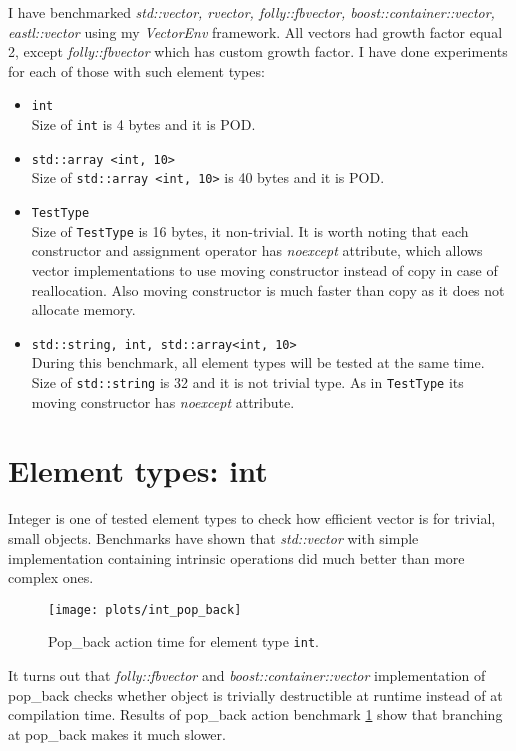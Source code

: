 \documentclass[inz, english, shortabstract]{iithesis}
\begin{document}
I have benchmarked {\it std::vector, rvector, folly::fbvector, boost::container::vector, eastl::vector} using my {\it VectorEnv} framework. All vectors had growth factor equal 2, except {\it folly::fbvector} which has custom growth factor. I have done experiments for each of those with such element types:
\begin{itemize}
\item \lstinline{int}
\\
Size of \lstinline{int} is 4 bytes and it is POD.
\item \lstinline{std::array <int, 10>}
\\
Size of \lstinline{std::array <int, 10>} is 40 bytes and it is POD.
\item \lstinline{TestType}
\\
Size of \lstinline{TestType} is 16 bytes, it non-trivial. It is worth noting that each constructor and assignment operator has {\it noexcept} attribute, which allows vector implementations to use moving constructor instead of copy in case of reallocation. Also moving constructor is much faster than copy as it does not allocate memory.
\item \lstinline{std::string, int, std::array<int, 10>}
\\
During this benchmark, all element types will be tested at the same time. Size of \lstinline{std::string} is 32 and it is not trivial type. As in \lstinline{TestType} its moving constructor has {\it noexcept} attribute.
\end{itemize}

\section{Element types: int}
Integer is one of tested element types to check how efficient vector is for trivial, small objects. Benchmarks have shown that {\it std::vector} with simple implementation containing intrinsic operations did much better than more complex ones. 

\begin{figure}[h!]
\label{int_pop_back}
\texttt{[image: plots/int\_pop\_back]}
\caption{Pop\_back action time for element type \lstinline{int}.}
\end{figure}

It turns out that {\it folly::fbvector} and {\it boost::container::vector} implementation of pop\_back checks whether object is trivially destructible at runtime instead of at compilation time. Results of pop\_back action benchmark \ref{int_pop_back} show that branching at pop\_back makes it much slower.
\end{document}
